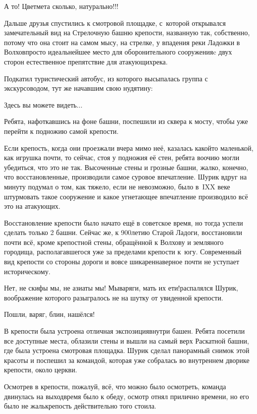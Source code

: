 \diagdash А то! Цветмета сколько, натурально!!!

Дальше друзья спустились к смотровой площадке, с~которой открывался замечательный вид на Стрелочную башню крепости, названную так, собственно, потому что она стоит на самом мысу, на стрелке, у впадения реки Ладожки в Волхов\mdash просто идеальнейшее место для оборонительного сооружения\mdash c двух сторон естественное препятствие для атакующих\mdash река.

Подкатил туристический автобус, из которого высыпалась группа с экскурсоводом, тут же начавшим свою нудятину:

\diagdash Здесь вы можете видеть$\ldots$

Ребята, нафоткавшись на фоне башни, поспешили из сквера к мосту, чтобы уже перейти к подножию самой крепости.

Если крепость, когда они проезжали вчера мимо неё, казалась какой\sdash то маленькой, как игрушка почти, то сейчас, стоя у подножия её стен, ребята воочию могли убедиться, что это не так. Высоченные стены и грозные башни, жалко, конечно, что восстановленные, производили самое суровое впечатление. Шурик вдруг на минуту подумал о том, как тяжело, если не невозможно, было в~IX\thinspace\mdash\thinspace X веке штурмовать такое сооружение и какое угнетающее впечатление производило всё это на атакующих.

Восстановление крепости было начато ещё в советское время, но тогда успели сделать только 2 башни. Сейчас же, к 900\sdash летию Старой Ладоги, восстановили почти всё, кроме крепостной стены, обращённой к Волхову и земляного городища, располагавшегося уже за пределами крепости к~югу. Современный вид крепости со стороны дороги и вовсе шикарен\mdash наверное почти не уступает историческому. 

\diagdash Нет, не скифы мы, не азиаты мы! Мы\mdash варяги, мать их ети!\mdash распалялся Шурик, воображение которого разыгралось не на шутку от увиденной крепости.

\diagdash Пошли, варяг, блин, нашёлся!

В крепости была устроена отличная экспозиция\mdash внутри башен. Ребята посетили все доступные места, облазили стены и вышли на самый верх Раскатной башни, где была устроена смотровая площадка. Шурик сделал панорамный снимок этой красоты и поспешил за командой, которая уже собралась во внутреннем дворике крепости, около церкви.

Осмотрев в крепости, пожалуй, всё, что можно было осмотреть, команда двинулась на выход\mdash время было к обеду, осмотр отнял прилично времени, но его было не жаль\mdash крепость действительно того стоила. 

